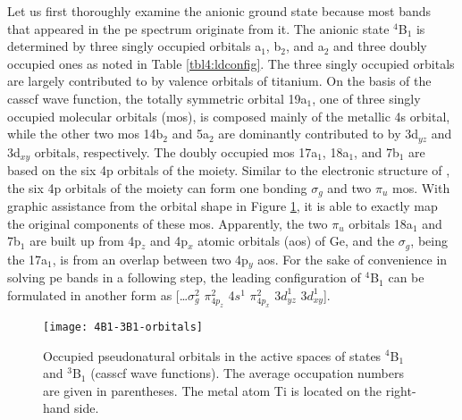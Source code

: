 \begin{refsection}
Let us first thoroughly examine the anionic ground state because most bands that appeared in the \acrshort{pe} spectrum originate from it. The anionic state $^4$B$_1$ is determined by three singly occupied orbitals a$_1$, b$_2$, and a$_2$ and three doubly occupied ones as noted in Table \ref{tbl4:ldconfig}. The three singly occupied orbitals are largely contributed to by valence orbitals of titanium. On the basis of the \acrshort{casscf} wave function, the totally symmetric orbital 19a$_1$, one of three singly occupied molecular orbitals (\acrshort{mo}s), is composed mainly of the metallic 4s orbital, while the other two \acrshort{mo}s 14b$_2$ and 5a$_2$ are dominantly contributed to by 3d$_{yz}$ and 3d$_{xy}$ orbitals, respectively. The doubly occupied \acrshort{mo}s 17a$_1$, 18a$_1$, and 7b$_1$ are based on the six 4p orbitals of the  moiety. Similar to the electronic structure of , \cite{c4:39} the six 4p orbitals of the  moiety can form one bonding $\sigma_g$ and two $\pi_u$ \acrshort{mo}s. With graphic assistance from the orbital shape in Figure \ref{fig4:orbs}, it is able to exactly map the original components of these \acrshort{mo}s. Apparently, the two $\pi_u$ orbitals 18a$_1$ and 7b$_1$ are built up from 4p$_z$ and 4p$_x$ atomic orbitals (\acrshort{ao}s) of Ge, and the $\sigma_g$, being the 17a$_1$, is from an overlap between two 4p$_y$ \acrshort{ao}s. For the sake of convenience in solving \acrshort{pe} bands in a following step, the leading configuration of $^4$B$_1$ can be formulated in another form as [\ldots $\sigma_g^2$ $\pi_{4p_z}^2$ 4$s^1$ $\pi_{4p_x}^2$ 3$d_{yz}^1$ 3$d_{xy}^1$].



\begin{figure}[htb!]
	\centering
	\texttt{[image: 4B1-3B1-orbitals]}
	\caption{Occupied pseudonatural orbitals in the active spaces of states $^4$B$_1$ and $^3$B$_1$ (\acrshort{casscf} wave functions). The average occupation numbers are given in parentheses. The metal atom Ti is located on the right-hand side.} 
	\label{fig4:orbs}
\end{figure} 




\end{refsection}

